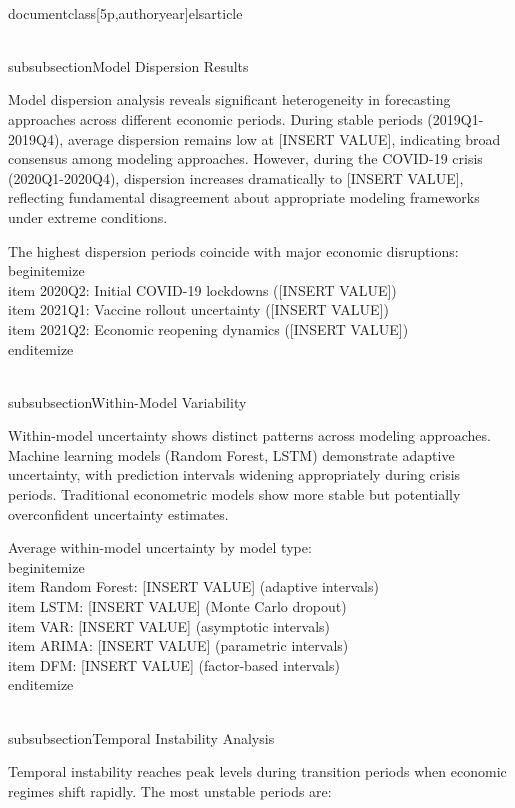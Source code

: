 \\documentclass[5p,authoryear]{elsarticle}
\begin{document}
\\subsubsection{Model Dispersion Results}

Model dispersion analysis reveals significant heterogeneity in forecasting approaches across different economic periods. During stable periods (2019Q1-2019Q4), average dispersion remains low at [INSERT VALUE], indicating broad consensus among modeling approaches. However, during the COVID-19 crisis (2020Q1-2020Q4), dispersion increases dramatically to [INSERT VALUE], reflecting fundamental disagreement about appropriate modeling frameworks under extreme conditions.

The highest dispersion periods coincide with major economic disruptions:
\\begin{itemize}
    \\item 2020Q2: Initial COVID-19 lockdowns ([INSERT VALUE])
    \\item 2021Q1: Vaccine rollout uncertainty ([INSERT VALUE])  
    \\item 2021Q2: Economic reopening dynamics ([INSERT VALUE])
\\end{itemize}

\\subsubsection{Within-Model Variability}

Within-model uncertainty shows distinct patterns across modeling approaches. Machine learning models (Random Forest, LSTM) demonstrate adaptive uncertainty, with prediction intervals widening appropriately during crisis periods. Traditional econometric models show more stable but potentially overconfident uncertainty estimates.

Average within-model uncertainty by model type:
\\begin{itemize}
    \\item Random Forest: [INSERT VALUE] (adaptive intervals)
    \\item LSTM: [INSERT VALUE] (Monte Carlo dropout)
    \\item VAR: [INSERT VALUE] (asymptotic intervals)
    \\item ARIMA: [INSERT VALUE] (parametric intervals)
    \\item DFM: [INSERT VALUE] (factor-based intervals)
\\end{itemize}

\\subsubsection{Temporal Instability Analysis}

Temporal instability reaches peak levels during transition periods when economic regimes shift rapidly. The most unstable periods are:
\end{document}
